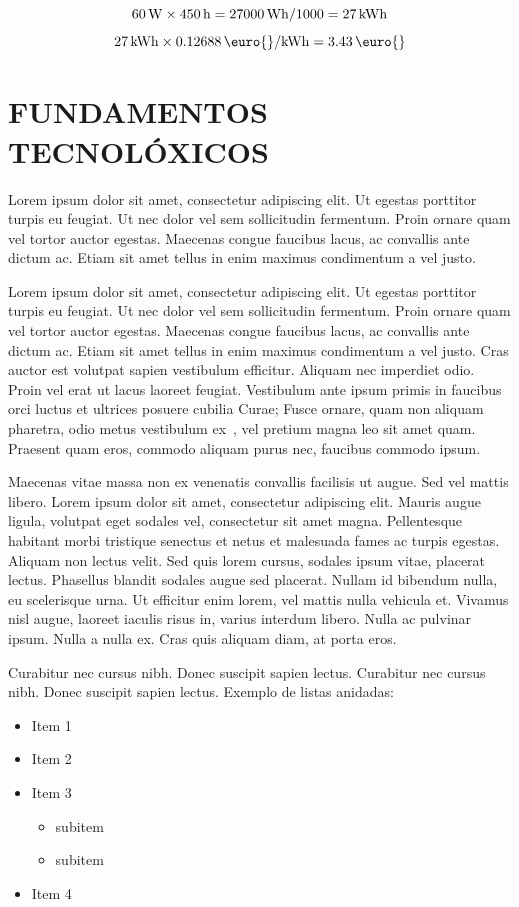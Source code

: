 \documentclass{pfc}
\begin{document}
$$\unit[60]{W} \times \unit[450]{h} = \unit[27000]{Wh}/1000 = \unit[27]{kWh}$$
$$\unit[27]{kWh} \times \unit[0.12688]{\euro{}/kWh} =
\unit[3.43]{\euro{}}$$



\chapter{FUNDAMENTOS TECNOLÓXICOS}
\label{chap:fund}

Lorem ipsum dolor sit amet, consectetur adipiscing elit. Ut egestas
porttitor turpis eu feugiat. Ut nec dolor vel sem sollicitudin
fermentum. Proin ornare quam vel tortor auctor egestas. Maecenas
congue faucibus lacus, ac convallis ante dictum ac. Etiam sit amet
tellus in enim maximus condimentum a vel justo.

Lorem ipsum dolor sit amet, consectetur adipiscing elit. Ut egestas
porttitor turpis eu feugiat. Ut nec dolor vel sem sollicitudin
fermentum. Proin ornare quam vel tortor auctor egestas. Maecenas
congue faucibus lacus, ac convallis ante dictum ac. Etiam sit amet
tellus in enim maximus condimentum a vel justo. Cras auctor est
volutpat sapien vestibulum efficitur. Aliquam nec imperdiet
odio. Proin vel erat ut lacus laoreet feugiat. Vestibulum ante ipsum
primis in faucibus orci luctus et ultrices posuere cubilia Curae;
Fusce ornare, quam non aliquam pharetra, odio metus vestibulum
ex~\cite{gccdoc}, vel pretium magna leo sit amet quam. Praesent quam
eros, commodo aliquam purus nec, faucibus commodo ipsum.

Maecenas vitae massa non ex venenatis convallis facilisis ut
augue. Sed vel mattis libero. Lorem ipsum dolor sit amet, consectetur
adipiscing elit. Mauris augue ligula, volutpat eget sodales vel,
consectetur sit amet magna. Pellentesque habitant morbi tristique
senectus et netus et malesuada fames ac turpis egestas. Aliquam non
lectus velit. Sed quis lorem cursus, sodales ipsum vitae, placerat
lectus. Phasellus blandit sodales augue sed placerat. Nullam id
bibendum nulla, eu scelerisque urna. Ut efficitur enim lorem, vel
mattis nulla vehicula et. Vivamus nisl augue, laoreet iaculis risus
in, varius interdum libero. Nulla ac pulvinar ipsum. Nulla a nulla
ex. Cras quis aliquam diam, at porta eros.

Curabitur nec cursus nibh. Donec suscipit sapien lectus. Curabitur nec
cursus nibh. Donec suscipit sapien lectus. Exemplo de listas anidadas:
\begin{itemize}
\item Item 1
\item Item 2
\item Item 3
  \begin{itemize}
  \item subitem
  \item subitem
  \end{itemize}
\item Item 4
\end{itemize}
\end{document}
